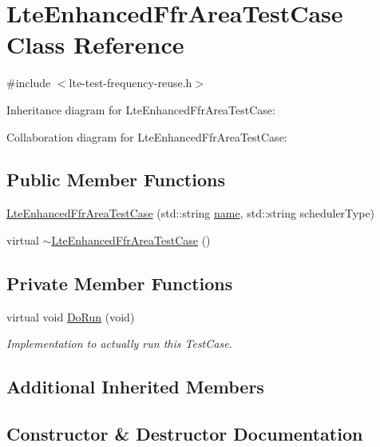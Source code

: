 \hypertarget{classLteEnhancedFfrAreaTestCase}{}\section{Lte\+Enhanced\+Ffr\+Area\+Test\+Case Class Reference}
\label{classLteEnhancedFfrAreaTestCase}


{\ttfamily \#include $<$lte-\/test-\/frequency-\/reuse.\+h$>$}



Inheritance diagram for Lte\+Enhanced\+Ffr\+Area\+Test\+Case\+:


Collaboration diagram for Lte\+Enhanced\+Ffr\+Area\+Test\+Case\+:
\subsection*{Public Member Functions}
\begin{DoxyCompactItemize}
\item 
\hyperlink{classLteEnhancedFfrAreaTestCase_aaa1718519bbbbbb0d63fa35bab7d7f41}{Lte\+Enhanced\+Ffr\+Area\+Test\+Case} (std\+::string \hyperlink{generate__test__data__lte__spectrum__model_8m_ab74e6bf80237ddc4109968cedc58c151}{name}, std\+::string scheduler\+Type)
\item 
virtual \hyperlink{classLteEnhancedFfrAreaTestCase_a7dabfbbdde52c183827a0992454984f5}{$\sim$\+Lte\+Enhanced\+Ffr\+Area\+Test\+Case} ()
\end{DoxyCompactItemize}
\subsection*{Private Member Functions}
\begin{DoxyCompactItemize}
\item 
virtual void \hyperlink{classLteEnhancedFfrAreaTestCase_aa242a1923952a50df92c3e291f1ca8a6}{Do\+Run} (void)
\begin{DoxyCompactList}\small\item\em Implementation to actually run this Test\+Case. \end{DoxyCompactList}\end{DoxyCompactItemize}
\subsection*{Additional Inherited Members}


\subsection{Constructor \& Destructor Documentation}
